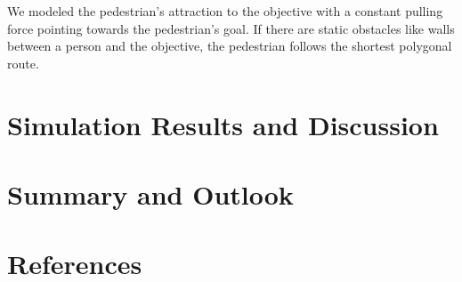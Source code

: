 \documentclass[11pt]{article}
\begin{document}
We modeled the pedestrian's attraction to the objective with a constant pulling force pointing towards the pedestrian's goal. If there are static obstacles like walls between a person and the objective, the pedestrian follows the shortest polygonal route.


\section{Simulation Results and Discussion}

\section{Summary and Outlook}

\section{References}







\end{document}
